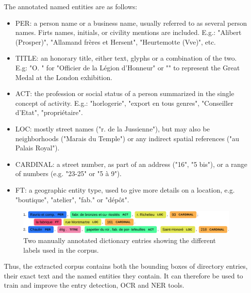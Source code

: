 The annotated named entities are as follows:
\begin{itemize}
    \item PER: a person name or a business name, usually referred to as several person names. Firts names, initials, or civility mentions are included. E.g.: "Alibert (Prosper)", "Allamand frères et Hersent", "Heurtemotte (Vve)", etc.
    \item TITLE: an honorary title, either text, glyphs or a combination of the two. E.g: "O. " for "Officier de la Légion d'Honneur" or "" to represent the Great Medal at the London exhibition.
    \item ACT: the profession or social status of a person summarized in the single concept of activity. E.g.: "horlogerie", "export en tous genres", "Conseiller d'Etat", "propriétaire".
    \item LOC: mostly street names ("r. de la Jussienne"), but may also be neighborhoods ("Marais du Temple") or any indirect spatial references ("au Palais Royal").
    \item CARDINAL: a street number, as part of an address ("16", "5 bis"), or a range of numbers (e.g. "23-25" or "5 à 9").
    \item FT: a geographic entity type, used to give more details on a location, e.g. "boutique", "atelier", "fab." or "dépôt".
\end{itemize}

\begin{figure}
    \centering
    \includegraphics[width=\textwidth]{images/examples_labeled_entries.pdf}
    \caption{Two manually annotated dictionary entries showing the different labels used in the corpus.}
    \label{fig:my_label}
\end{figure}
Thus, the extracted corpus contains both the bounding boxes of directory entries, their exact text and the named entities they contain. It can therefore be used to train and improve the entry detection, OCR and NER tools.

